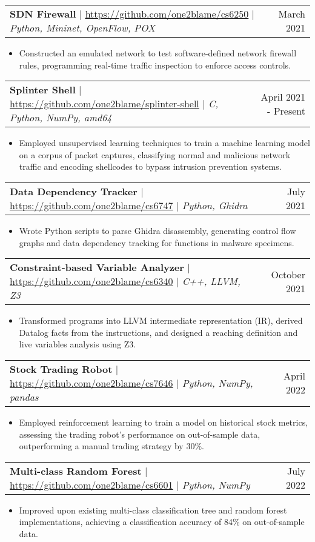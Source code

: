 \documentclass[letterpaper,11pt]{article}
\makeatletter
\newcommand{\resumeItem}[1]{
  \item\small{
    {#1 \vspace{-2pt}}
  }
}
\newcommand{\resumeProjectHeading}[2]{
    \item
    \begin{tabular*}{0.97\textwidth}{l@{\extracolsep{\fill}}r}
      \small#1 & #2 \\
    \end{tabular*}\vspace{-7pt}
}
\newcommand{\resumeItemListStart}{\begin{itemize}[rightmargin=\dimexpr\linewidth-16cm-\leftmargin\relax]}
\newcommand{\resumeItemListEnd}{\end{itemize}\vspace{-5pt}}
\makeatother
\begin{document}
\resumeProjectHeading
{\textbf{SDN Firewall} $|$ \href{https://github.com/one2blame/cs6250}{\underline{https://github.com/one2blame/cs6250}} $|$ \emph{Python, Mininet, OpenFlow, POX}}{March 2021}
\resumeItemListStart
\resumeItem{Constructed an emulated network to test software-defined network firewall rules, programming real-time traffic inspection to enforce access controls.}
\resumeItemListEnd

\resumeProjectHeading
{\textbf{Splinter Shell} $|$ \href{https://github.com/one2blame/splinter-shell}{\underline{https://github.com/one2blame/splinter-shell}} $|$ \emph{C, Python, NumPy, amd64}}{April 2021 - Present}
\resumeItemListStart
\resumeItem{Employed unsupervised learning techniques to train a machine learning model on a corpus of packet captures, classifying normal and malicious network traffic and encoding shellcodes to bypass intrusion prevention systems.}
\resumeItemListEnd

\resumeProjectHeading
{\textbf{Data Dependency Tracker} $|$ \href{https://github.com/one2blame/cs6747}{\underline{https://github.com/one2blame/cs6747}} $|$ \emph{Python, Ghidra}}{July 2021}
\resumeItemListStart
\resumeItem{Wrote Python scripts to parse Ghidra disassembly, generating control flow graphs and data dependency tracking for functions in malware specimens.}
\resumeItemListEnd

\resumeProjectHeading
{\textbf{Constraint-based Variable Analyzer} $|$ \href{https://github.com/one2blame/cs6340}{\underline{https://github.com/one2blame/cs6340}} $|$ \emph{C++, LLVM, Z3}}{October 2021}
\resumeItemListStart
\resumeItem{Transformed programs into LLVM intermediate representation (IR), derived Datalog facts from the instructions, and designed a reaching definition and live variables analysis using Z3.}
\resumeItemListEnd

\resumeProjectHeading
{\textbf{Stock Trading Robot} $|$ \href{https://github.com/one2blame/cs7646}{\underline{https://github.com/one2blame/cs7646}} $|$ \emph{Python, NumPy, pandas}}{April 2022}
\resumeItemListStart
\resumeItem{Employed reinforcement learning to train a model on historical stock metrics, assessing the trading robot's performance on out-of-sample data, outperforming a manual trading strategy by 30\%.}
\resumeItemListEnd

\resumeProjectHeading
{\textbf{Multi-class Random Forest} $|$ \href{https://github.com/one2blame/cs6601}{\underline{https://github.com/one2blame/cs6601}} $|$ \emph{Python, NumPy}}{July 2022}
\resumeItemListStart
\resumeItem{Improved upon existing multi-class classification tree and random forest implementations, achieving a classification accuracy of 84\% on out-of-sample data.}
\resumeItemListEnd
\end{document}
